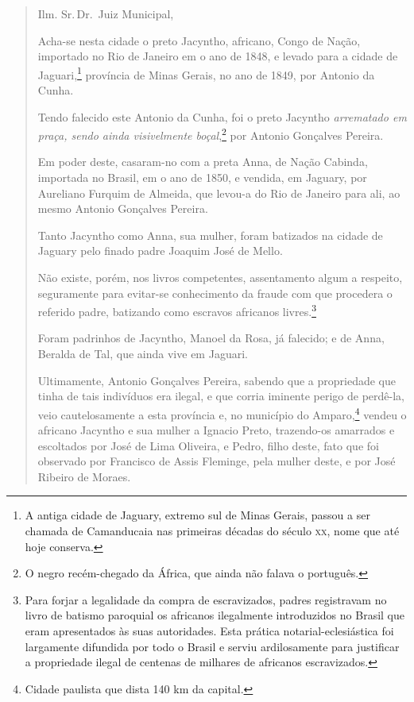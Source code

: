 \begin{quote}
Ilm. Sr.\,Dr.~Juiz Municipal,

Acha-se nesta cidade o preto Jacyntho, africano, Congo de Nação,
importado no Rio de Janeiro em o ano de 1848, e levado para a cidade de
Jaguari,\footnote{A antiga cidade de Jaguary, extremo sul de Minas
  Gerais, passou a ser chamada de Camanducaia nas primeiras décadas do
  século \textsc{xx}, nome que até hoje conserva.} província de Minas Gerais, no
ano de 1849, por Antonio da Cunha.

Tendo falecido este Antonio da Cunha, foi o preto Jacyntho
\emph{arrematado em praça, sendo ainda visivelmente boçal},\footnote{O
  negro recém-chegado da África, que ainda não falava o português.} por
Antonio Gonçalves Pereira.

Em poder deste, casaram-no com a preta Anna, de Nação Cabinda, importada
no Brasil, em o ano de 1850, e vendida, em Jaguary, por Aureliano
Furquim de Almeida, que levou-a do Rio de Janeiro para ali, ao mesmo
Antonio Gonçalves Pereira.

Tanto Jacyntho como Anna, sua mulher, foram batizados na cidade de
Jaguary pelo finado padre Joaquim José de Mello.

Não existe, porém, nos livros competentes, assentamento algum a
respeito, seguramente para evitar-se conhecimento da fraude com que
procedera o referido padre, batizando como escravos africanos
livres.\footnote{Para forjar a legalidade da compra de escravizados,
  padres registravam no livro de batismo paroquial os africanos
  ilegalmente introduzidos no Brasil que eram apresentados às suas
  autoridades. Esta prática notarial-eclesiástica foi largamente
  difundida por todo o Brasil e serviu ardilosamente para justificar a
  propriedade ilegal de centenas de milhares de africanos escravizados.}

Foram padrinhos de Jacyntho, Manoel da Rosa, já falecido; e de Anna,
Beralda de Tal, que ainda vive em Jaguari.

Ultimamente, Antonio Gonçalves Pereira, sabendo que a propriedade que
tinha de tais indivíduos era ilegal, e que corria iminente perigo de
perdê-la, veio cautelosamente a esta província e, no município do
Amparo,\footnote{Cidade paulista que dista 140 km da capital.} vendeu
o africano Jacyntho e sua mulher a Ignacio Preto, trazendo-os amarrados
e escoltados por José de Lima Oliveira, e Pedro, filho deste, fato que
foi observado por Francisco de Assis Fleminge, pela mulher deste, e por
José Ribeiro de Moraes.


\end{quote}
